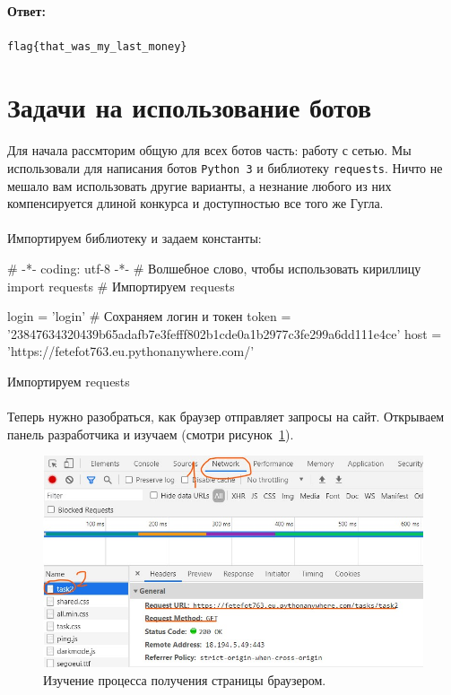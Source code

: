 \documentclass[12pt]{article}
\begin{document}
    \paragraph{Ответ:}
    \verb|flag{that_was_my_last_money}|

    \newpage

    \section{Задачи на использование ботов}
	\paragraph{}
    Для начала рассмторим общую для всех ботов часть: работу с сетью.
	Мы использовали для написания ботов \verb|Python 3| и библиотеку \verb|requests|.
	Ничто не мешало вам использовать другие варианты,
	а незнание любого из них компенсируется длиной конкурса и доступностью все того же Гугла.
	\paragraph{}
    Импортируем библиотеку и задаем константы:
    \begin{listing}[H]
        \begin{pythoncode}
# -*- coding: utf-8 -*- # Волшебное слово, чтобы использовать кириллицу
import requests # Импортируем requests

login = 'login' # Сохраняем логин и токен
token = '23847634320439b65adafb7e3fefff802b1cde0a1b2977c3fe299a6dd111e4ce'
host = 'https://fetefot763.eu.pythonanywhere.com/'
        \end{pythoncode}
        \caption{Импортируем requests}
        \label{lst:import_requests}
    \end{listing}
    \paragraph{}
    Теперь нужно разобраться, как браузер отправляет запросы на сайт.
    Открываем панель разработчика и изучаем (смотри рисунок~\ref{fig:browser1}).
    \begin{figure}[H]
        \centering
        \includegraphics[width=15cm]{BrowserNetworkAnalysis0}
        \caption{Изучение процесса получения страницы браузером.}
        \label{fig:browser1}
    \end{figure}
\end{document}
